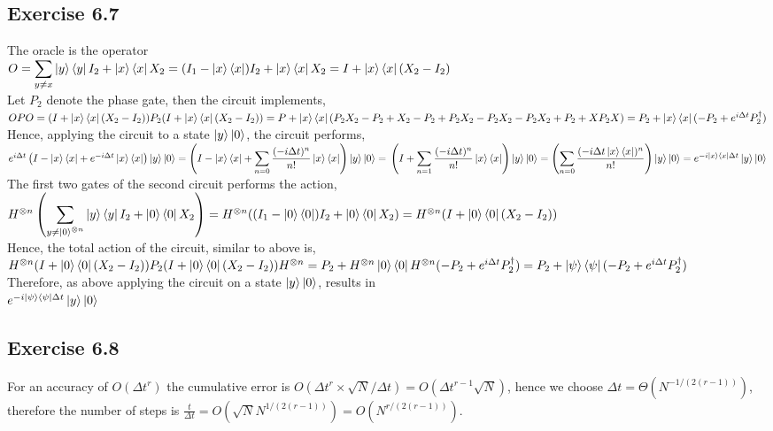 \documentclass[a4paper,12pt]{article}
\begin{document}
\subsection*{Exercise 6.7}
The oracle is the operator \\
$O=\displaystyle\sum_{y\neq x}\ket{y}\bra{y}I_2+\ket{x}\bra{x}X_2=
(I_1-\ket{x}\bra{x})I_2+\ket{x}\bra{x}X_2=I+\ket{x}\bra{x}(X_2-I_2)$\\
Let $P_2$ denote the phase gate, then the circuit implements,\\
$OPO=(I+\ket{x}\bra{x}(X_2-I_2))P_2(I+\ket{x}\bra{x}(X_2-I_2))=
P+\ket{x}\bra{x}(P_2X_2-P_2+X_2-P_2+P_2X_2-P_2X_2-P_2X_2+P_2+XP_2X)=
P_2+\ket{x}\bra{x}(-P_2+e^{i\Delta t}P_2^\dagger)$\\
Hence, applying the circuit to a state $\ket{y}\ket{0}$, the circuit performs,\\
$e^{i\Delta t}\left(I-\ket{x}\bra{x}+e^{-i\Delta t}\ket{x}\bra{x}\right)\ket{y}\ket{0}=
\left(I-\ket{x}\bra{x}+\displaystyle\sum_{n=0}\frac{(-i\Delta t)^n}{n!}\ket{x}\bra{x}\right)\ket{y}\ket{0}=\\
\left(I+\displaystyle\sum_{n=1}\frac{(-i\Delta t)^n}{n!}\ket{x}\bra{x}\right)\ket{y}\ket{0}=
\left(\displaystyle\sum_{n=0}\frac{(-i\Delta t\ket{x}\bra{x})^n}{n!}\right)\ket{y}\ket{0}=
e^{-i\ket{x}\bra{x}\Delta t}\ket{y}\ket{0}$\\
The first two gates of the second circuit performs the action,\\
$H^{\otimes n}\left(\displaystyle\sum_{y\neq \ket{0}^{\otimes n}}\ket{y}\bra{y}I_2+\ket{0}\bra{0}X_2\right)=
H^{\otimes n}((I_1-\ket{0}\bra{0})I_2+\ket{0}\bra{0}X_2)=H^{\otimes n}(I+\ket{0}\bra{0}(X_2-I_2))$\\
Hence, the total action of the circuit, similar to above is,\\
$H^{\otimes n}(I+\ket{0}\bra{0}(X_2-I_2))P_2(I+\ket{0}\bra{0}(X_2-I_2))H^{\otimes n}=
P_2+H^{\otimes n}\ket{0}\bra{0}H^{\otimes n}(-P_2+e^{i\Delta t}P_2^\dagger)=
P_2+\ket{\psi}\bra{\psi}(-P_2+e^{i\Delta t}P_2^\dagger)$\\
Therefore, as above applying the circuit on a state $\ket{y}\ket{0}$, results in\\
$e^{-i\ket{\psi}\bra{\psi}\Delta t}\ket{y}\ket{0}$
\subsection*{Exercise 6.8}
For an accuracy of $O(\Delta t^r)$ the cumulative error is $O(\Delta t^r \times \sqrt{N}/\Delta t)=
O(\Delta t^{r-1}\sqrt{N})$, hence we choose $\Delta t=\Theta(N^{-1/(2(r-1))})$, therefore the number of steps is
$\frac{t}{\Delta t}=O(\sqrt{N}N^{1/(2(r-1))})=O(N^{r/(2(r-1))})$.
\end{document}
